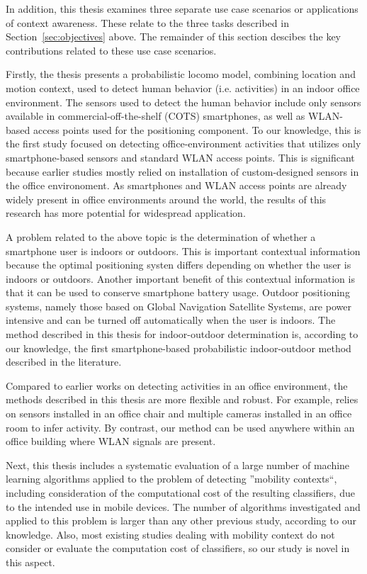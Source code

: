 In addition, this thesis examines three separate use case scenarios or applications of context awareness. These relate to the three tasks described in Section~\ref{sec:objectives} above. The remainder of this section descibes the key contributions related to these use case scenarios.

Firstly, the thesis presents a probabilistic \gls{locomo} model, combining location and motion context, used to detect human behavior (i.e. activities) in an indoor office environment. The sensors used to detect the human behavior include only sensors available in commercial-off-the-shelf (COTS) smartphones, as well as WLAN-based access points used for the positioning component. To our knowledge, this is the first study focused on detecting office-environment activities that utilizes only smartphone-based sensors and standard WLAN access points. This is significant because earlier studies mostly relied on installation of custom-designed sensors in the office environoment. As smartphones and WLAN access points are already widely present in office environments around the world, the results of this research has more potential for widespread application.

A problem related to the above topic is the determination of whether a smartphone user is indoors or outdoors. This is important contextual information because the optimal positioning systen differs depending on whether the user is indoors or outdoors. Another important benefit of this contextual information is that it can be used to conserve smartphone battery usage. Outdoor positioning systems, namely those based on Global Navigation Satellite Systems, are power intensive and can be turned off automatically when the user is indoors. The method described in this thesis  for indoor-outdoor determination is, according to our knowledge, the first smartphone-based probabilistic indoor-outdoor method described in the literature.

Compared to earlier works on detecting activities in an office environment, the methods described in this thesis are more flexible and robust. For example, \cite{Manabe2010} relies on sensors installed in an office chair and multiple cameras installed in an office room to infer activity. By contrast, our method can be used anywhere within an office building where WLAN signals are present.

Next, this thesis includes a systematic evaluation of a large number of machine learning algorithms applied to the problem of detecting ''mobility contexts``, including consideration of the computational cost of the resulting classifiers, due to the intended use in mobile devices. The number of algorithms investigated and applied to this problem is larger than any other previous study, according to our knowledge. Also, most existing studies dealing with mobility context do not consider or evaluate the computation cost of classifiers, so our study is novel in this aspect.

